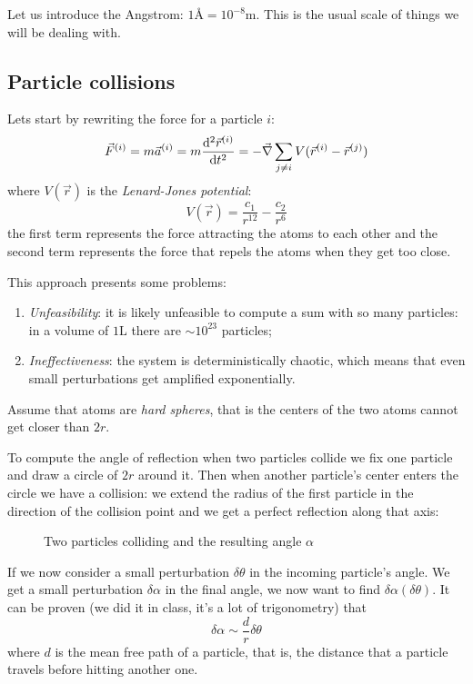 \documentclass[12pt]{extarticle}
\begin{document}
Let us introduce the Angstrom: $1 \si{\angstrom} = 10^{-8} \si{\meter}$. This is the usual scale of things we will be dealing with.

\subsection{Particle collisions}

Lets start by rewriting the force for a particle $i$:
\begin{equation}
    \vec F^{(i)} = m \vec a^{(i)} = m \dv[2]{\vec r^{(i)}}{t} = - \vec \nabla \sum_{j \ne i} V(\vec r^{(i)} - \vec r^{(j)})
\end{equation}
where $V(\vec r)$ is the \emph{Lenard-Jones potential}:
\begin{equation}
    V(\vec r) = \frac{c_1}{r^{12}} - \frac{c_2}{r^6}
\end{equation}
the first term represents the force attracting the atoms to each other and the second term represents the force that repels the atoms when they get too close.

This approach presents some problems:
\begin{enumerate}
    \item \emph{Unfeasibility}: it is likely unfeasible to compute a sum with so many particles: in a volume of $1 \si{\liter}$ there are $\sim 10^{23}$ particles;
    \item \emph{Ineffectiveness}: the system is deterministically chaotic, which means that even small perturbations get amplified exponentially.
\end{enumerate}

Assume that atoms are \emph{hard spheres}, that is the centers of the two atoms cannot get closer than $2r$.

To compute the angle of reflection when two particles collide we fix one particle and draw a circle of $2r$ around it.
Then when another particle's center enters the circle we have a collision: we extend the radius of the first particle in the direction of the collision point and we get a perfect reflection along that axis:

\begin{figure}[H]
    \centering
    
    \caption{Two particles colliding and the resulting angle $\alpha$}
\end{figure}

If we now consider a small perturbation $\delta \theta$ in the incoming particle's angle.
We get a small perturbation $\delta \alpha$ in the final angle, we now want to find $\delta \alpha(\delta \theta)$.
It can be proven (we did it in class, it's a lot of trigonometry) that
\begin{equation}
    \delta \alpha \sim \frac{d}{r} \delta \theta
\end{equation}
where $d$ is the mean free path of a particle, that is, the distance that a particle travels before hitting another one.
\end{document}
